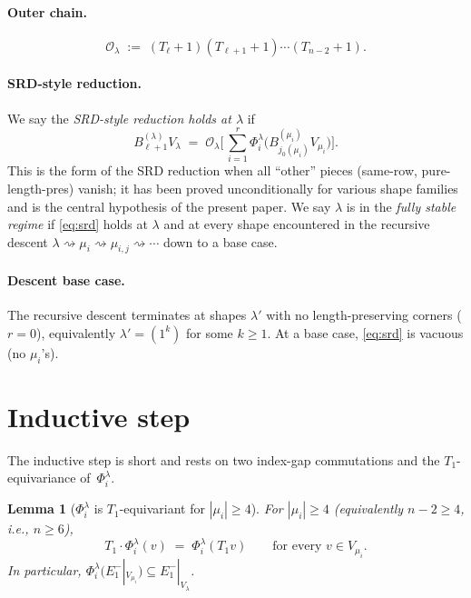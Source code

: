 \documentclass[11pt]{article}
\newtheorem{lemma}[theorem]{Lemma}
\theoremstyle{definition}
\begin{document}
\paragraph{Outer chain.}
\[
   \mathcal{O}_\lambda \;:=\;
   (T_\ell{+}1)(T_{\ell+1}{+}1)\cdots(T_{n-2}{+}1).
\]

\paragraph{SRD-style reduction.}
We say the \emph{SRD-style reduction holds at $\lambda$} if
\begin{equation}\label{eq:srd}
   B^{(\lambda)}_{\ell+1} V_\lambda
   \;=\;
   \mathcal{O}_\lambda \Big[\,
      \sum_{i=1}^r \Phi_i^\lambda\big(B^{(\mu_i)}_{j_0(\mu_i)} V_{\mu_i}\big)
   \Big].
\end{equation}
This is the form of the SRD reduction when all ``other'' pieces
(same-row, pure-length-pres) vanish; it has been proved unconditionally
for various shape families and is the central hypothesis of the
present paper. We say $\lambda$ is in the
\emph{fully stable regime} if \eqref{eq:srd} holds at $\lambda$ and at
every shape encountered in the recursive descent
$\lambda \rightsquigarrow \mu_i \rightsquigarrow \mu_{i,j}
\rightsquigarrow \cdots$ down to a base case.

\paragraph{Descent base case.} The recursive descent terminates at
shapes $\lambda'$ with no length-preserving corners ($r = 0$),
equivalently $\lambda' = (1^k)$ for some $k \ge 1$. At a base case,
\eqref{eq:srd} is vacuous (no $\mu_i$'s).

\section{Inductive step}\label{sec:induction}

The inductive step is short and rests on two index-gap commutations
and the $T_1$-equivariance of~$\Phi_i^\lambda$.

\begin{lemma}[$\Phi_i^\lambda$ is $T_1$-equivariant for $|\mu_i| \ge 4$]\label{lem:phi-T1-equiv}
For $|\mu_i| \ge 4$ (equivalently $n - 2 \ge 4$, i.e., $n \ge 6$),
\[
   T_1 \cdot \Phi_i^\lambda(v) \;=\; \Phi_i^\lambda(T_1 v)
   \qquad \text{for every } v \in V_{\mu_i}.
\]
In particular, $\Phi_i^\lambda(E_1^-|_{V_{\mu_i}}) \subseteq E_1^-|_{V_\lambda}$.
\end{lemma}
\end{document}
